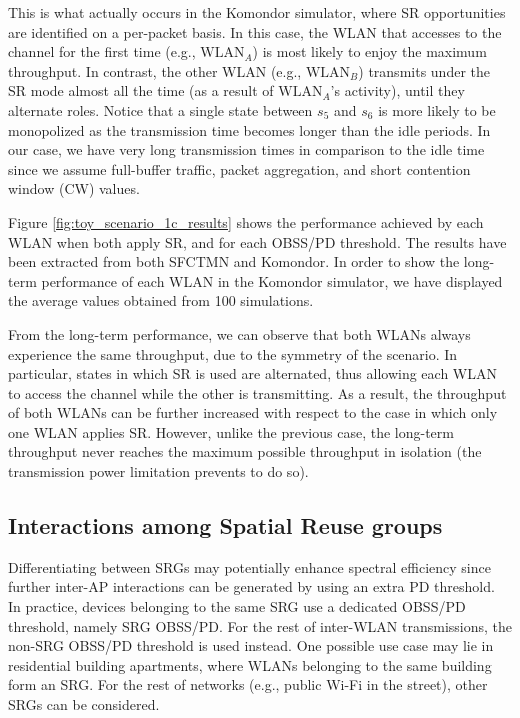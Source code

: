 \documentclass[preprint,12pt]{elsarticle}
\begin{document}
	This is what actually occurs in the Komondor simulator, where SR opportunities are identified on a per-packet basis. In this case, the WLAN that accesses to the channel for the first time (e.g., $\text{WLAN}_A$) is most likely to enjoy the maximum throughput. In contrast, the other WLAN (e.g., $\text{WLAN}_B$) transmits under the SR mode almost all the time (as a result of $\text{WLAN}_A$'s activity), until they alternate roles. Notice that a single state between $s_5$  and $s_6$ is more likely to be monopolized as the transmission time becomes longer than the idle periods. In our case, we have very long transmission times in comparison to the idle time since we assume full-buffer traffic, packet aggregation, and short contention window (CW) values.
	
	Figure \ref{fig:toy_scenario_1c_results} shows the performance achieved by each WLAN when both apply SR, and for each OBSS/PD threshold. The results have been extracted from both SFCTMN and Komondor. In order to show the long-term performance of each WLAN in the Komondor simulator, we have displayed the average values obtained from 100 simulations.
	
	From the long-term performance, we can observe that both WLANs always experience the same throughput, due to the symmetry of the scenario. In particular, states in which SR is used are alternated, thus allowing each WLAN to access the channel while the other is transmitting. As a result, the throughput of both WLANs can be further increased with respect to the case in which only one WLAN applies SR. However, unlike the previous case, the long-term throughput never reaches the maximum possible throughput in isolation (the transmission power limitation prevents to do so).
	
	\subsection{Interactions among Spatial Reuse groups}
	\label{section:advanced_interactions}
	
	Differentiating between SRGs may potentially enhance spectral efficiency since further inter-AP interactions can be generated by using an extra PD threshold. In practice, devices belonging to the same SRG use a dedicated OBSS/PD threshold, namely SRG OBSS/PD. For the rest of inter-WLAN transmissions, the non-SRG OBSS/PD threshold is used instead. One possible use case may lie in residential building apartments, where WLANs belonging to the same building form an SRG. For the rest of networks (e.g., public Wi-Fi in the street), other SRGs can be considered.
	
\end{document}
